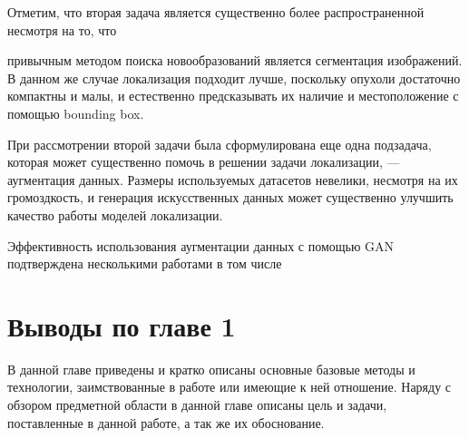   

Отметим, что вторая задача является существенно более распространенной несмотря на то, что 

привычным методом поиска новообразований является сегментация изображений. В данном же случае локализация подходит лучше, поскольку опухоли достаточно компактны и малы, и естественно предсказывать их наличие и местоположение с помощью bounding box. 

  

При рассмотрении второй задачи была сформулирована еще одна подзадача, которая может существенно помочь в решении задачи локализации, --- аугментация данных. Размеры используемых датасетов невелики, несмотря на их громоздкость, и генерация искусственных данных может существенно улучшить качество работы моделей локализации. 

  

Эффективность использования аугментации данных с помощью GAN подтверждена несколькими работами в том числе \cite{han2019synthesizing} \cite{wgan-augmentation-2} \cite{wgan-augmentation} 


\section{Выводы по главе 1}

В данной главе приведены и кратко описаны основные базовые методы и технологии, заимствованные в работе или имеющие к ней отношение. Наряду с обзором предметной области в данной главе описаны цель и задачи, поставленные в данной работе, а так же их обоснование.

\finishrelatedwork